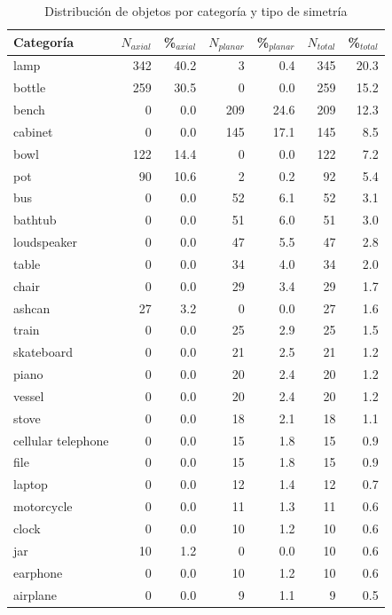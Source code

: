\begin{table}[ht]
  \centering
  \caption{Distribución de objetos por categoría y tipo de simetría}
  \label{tab:dist_categorias}
  \begin{tabular}{lrrrrrr}
    \toprule
    Categoría & $N_{axial}$ & \%$_{axial}$ & $N_{planar}$ & \%$_{planar}$ & $N_{total}$ & \%$_{total}$ \\
    \midrule
    lamp & 342 & 40.2 & 3 & 0.4 & 345 & 20.3 \\
    bottle & 259 & 30.5 & 0 & 0.0 & 259 & 15.2 \\
    bench & 0 & 0.0 & 209 & 24.6 & 209 & 12.3 \\
    cabinet & 0 & 0.0 & 145 & 17.1 & 145 & 8.5 \\
    bowl & 122 & 14.4 & 0 & 0.0 & 122 & 7.2 \\
    pot & 90 & 10.6 & 2 & 0.2 & 92 & 5.4 \\
    bus & 0 & 0.0 & 52 & 6.1 & 52 & 3.1 \\
    bathtub & 0 & 0.0 & 51 & 6.0 & 51 & 3.0 \\
    loudspeaker & 0 & 0.0 & 47 & 5.5 & 47 & 2.8 \\
    table & 0 & 0.0 & 34 & 4.0 & 34 & 2.0 \\
    chair & 0 & 0.0 & 29 & 3.4 & 29 & 1.7 \\
    ashcan & 27 & 3.2 & 0 & 0.0 & 27 & 1.6 \\
    train & 0 & 0.0 & 25 & 2.9 & 25 & 1.5 \\
    skateboard & 0 & 0.0 & 21 & 2.5 & 21 & 1.2 \\
    piano & 0 & 0.0 & 20 & 2.4 & 20 & 1.2 \\
    vessel & 0 & 0.0 & 20 & 2.4 & 20 & 1.2 \\
    stove & 0 & 0.0 & 18 & 2.1 & 18 & 1.1 \\
    cellular telephone & 0 & 0.0 & 15 & 1.8 & 15 & 0.9 \\
    file & 0 & 0.0 & 15 & 1.8 & 15 & 0.9 \\
    laptop & 0 & 0.0 & 12 & 1.4 & 12 & 0.7 \\
    motorcycle & 0 & 0.0 & 11 & 1.3 & 11 & 0.6 \\
    clock & 0 & 0.0 & 10 & 1.2 & 10 & 0.6 \\
    jar & 10 & 1.2 & 0 & 0.0 & 10 & 0.6 \\
    earphone & 0 & 0.0 & 10 & 1.2 & 10 & 0.6 \\
    airplane & 0 & 0.0 & 9 & 1.1 & 9 & 0.5 \\

\end{tabular}
\end{table}
